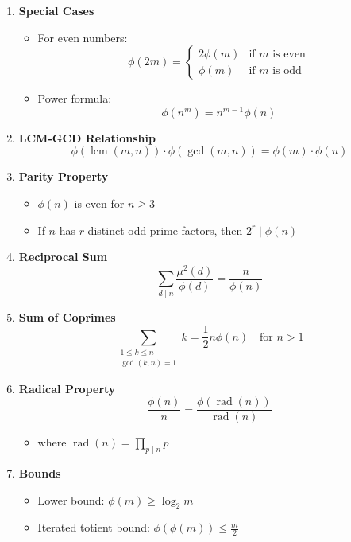\begin{enumerate}[leftmargin=*]
    \item \textbf{Special Cases}
        \begin{itemize}
            \item For even numbers:
            \[\phi(2m) = \begin{cases}
                2\phi(m) & \text{if } m \text{ is even} \\
                \phi(m) & \text{if } m \text{ is odd}
            \end{cases}\]
            \item Power formula:
            \[\phi(n^m) = n^{m-1}\phi(n)\]
        \end{itemize}
    
    \item \textbf{LCM-GCD Relationship}
        \[\phi(\operatorname{lcm}(m,n)) \cdot \phi(\gcd(m,n)) = \phi(m) \cdot \phi(n)\]
    
    \item \textbf{Parity Property}
        \begin{itemize}
            \item $\phi(n)$ is even for $n \geq 3$
            \item If $n$ has $r$ distinct odd prime factors, then $2^r \mid \phi(n)$
        \end{itemize}
    
    \item \textbf{Reciprocal Sum}
        \[\sum_{d \mid n} \frac{\mu^2(d)}{\phi(d)} = \frac{n}{\phi(n)}\]
    
    \item \textbf{Sum of Coprimes}
        \[\sum_{\substack{1 \leq k \leq n \\ \gcd(k,n)=1}} k = \frac{1}{2}n\phi(n) \quad \text{for } n > 1\]
    
    \item \textbf{Radical Property}
        \[\frac{\phi(n)}{n} = \frac{\phi(\operatorname{rad}(n))}{\operatorname{rad}(n)}\]
        \begin{itemize}
            \item where $\operatorname{rad}(n) = \prod_{p \mid n} p$
        \end{itemize}
    
    \item \textbf{Bounds}
        \begin{itemize}
            \item Lower bound: $\phi(m) \geq \log_2 m$
            \item Iterated totient bound: $\phi(\phi(m)) \leq \frac{m}{2}$
        \end{itemize}
    

\end{enumerate}
